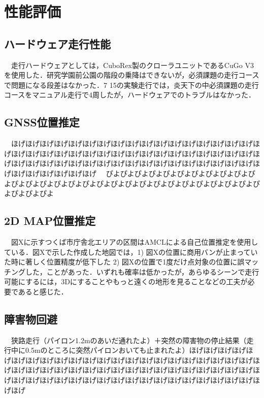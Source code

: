 \documentclass[platex,dvipdfmx]{rbproceedings}
\begin{document}
\section{性能評価}
\subsection{ハードウェア走行性能}
　走行ハードウェアとしては，CuboRex製のクローラユニットであるCuGo V3を使用した．研究学園前公園の階段の乗降はできないが，必須課題の走行コースで問題になる段差はなかった．7 15の実験走行では，炎天下の中必須課題の走行コースをマニュアル走行で4周したが，ハードウェアでのトラブルはなかった．

\subsection{GNSS位置推定}
　ほげほげほげほげほげほげほげほげほげほげほげほげほげほげほげほげほげほげほげほげほげほげほげほげほげほげほげほげほげほげほげほげほげほげほげほげほげほげほげほげほげほげほげほげほげほげほげほげほげほげほげほげほげほげほげほげほげほげほげほげ
　ぴよぴよぴよぴよぴよぴよぴよぴよぴよぴよぴよぴよぴよぴよぴよぴよぴよぴよぴよぴよぴよぴよぴよぴよぴよぴよぴよぴよぴよぴよぴよぴよ


\subsection{2D MAP位置推定}
　図Xに示すつくば市庁舎北エリアの区間はAMCLによる自己位置推定を使用している．図Xで示した作成した地図では，1) 図Xの位置に商用バンが止まっていた時に著しく位置精度が低下した 2) 図Xの位置で1度だけ点対象の位置に誤マッチングした，ことがあった．いずれも確率は低かったが，あらゆるシーンで走行可能にするには，3Dにすることやもっと遠くの地形を見ることなどの工夫が必要であると感じた．

\subsection{障害物回避}
　狭路走行（パイロン1.2mのあいだ通れたよ）＋突然の障害物の停止結果（走行中に0.5mのところに突然パイロンおいても止まれたよ）ほげほげほげほげほげほげほげほげほげほげほげほげほげほげほげほげほげほげほげほげほげほげほげほげほげほげほげほげほげほげほげほげほげほげほげほげほげほげほげほげほげほげほげほげほげほげほげほげほげほげほげほげほげほげほげほげほげほげほげほげ
\end{document}
